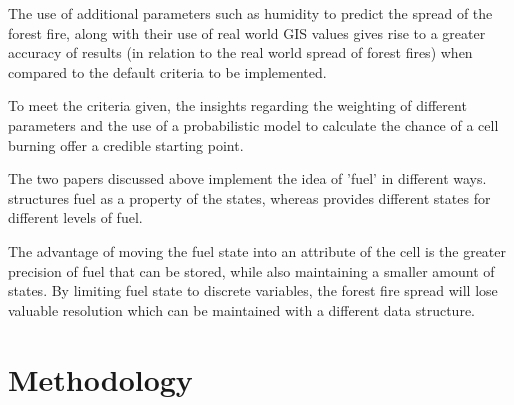 \documentclass[11pt, a4paper, titlepage]{article}
\begin{document}
  

  The use of additional parameters such as humidity to predict the spread of the forest fire, along with their use of real world GIS values gives rise to a greater accuracy of results (in relation to the real world spread of forest fires) when compared to the default criteria to be implemented.

  To meet the criteria given, the insights regarding the weighting of different parameters and the use of a probabilistic model to calculate the chance of a cell burning offer a credible starting point.

  The two papers discussed above implement the idea of 'fuel' in different ways. \cite{ALEXANDRIDIS2008191} structures fuel as a property of the states, whereas \cite{HERNANDEZENCINAS20071213} provides different states for different levels of fuel. 
  
  The advantage of moving the fuel state into an attribute of the cell is the greater precision of fuel that can be stored, while also maintaining a smaller amount of states. By limiting fuel state to discrete variables, the forest fire spread will lose valuable resolution which can be maintained with a different data structure.
\section{Methodology}
\end{document}
